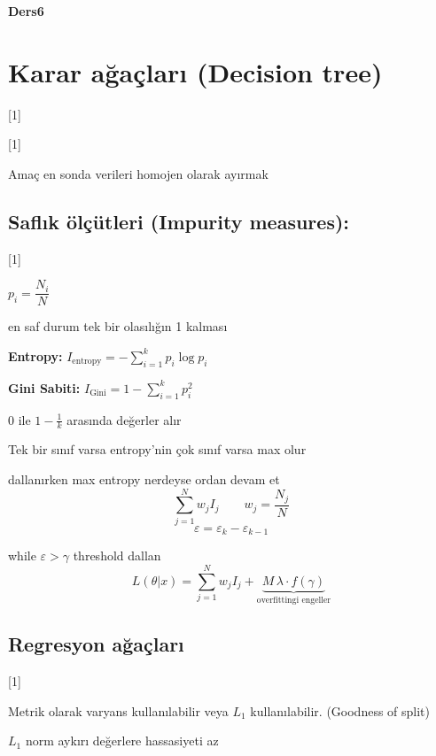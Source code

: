 \documentclass[11pt,a4paper]{article}
\begin{document}

\textbf{Ders6}

\section{Karar ağaçları (Decision tree)}

[1]

[1]

Amaç en sonda verileri homojen olarak ayırmak

\subsection{Saflık ölçütleri (Impurity measures):}

[1]

$p_i=\dfrac{N_i}{N}$

en saf durum tek bir olasılığın 1 kalması

\textbf{Entropy:} \quad $I_{\mathrm{entropy}} = -\sum_{i=1}^{k} p_i \log p_i$

\textbf{Gini Sabiti:} \quad $I_{\mathrm{Gini}} = 1-\sum_{i=1}^{k} p_i^{2}$

0 ile $1-\frac{1}{k}$ arasında değerler alır

Tek bir sınıf varsa entropy'nin çok sınıf varsa max olur

dallanırken max entropy nerdeyse ordan devam et
\[ \sum_{j=1}^{N} w_j I_j \qquad w_j=\frac{N_j}{N} \]
\[ \varepsilon = \varepsilon_k - \varepsilon_{k-1} \]

while $\varepsilon > \gamma$ threshold dallan
\[ L(\theta|x)=\sum_{j=1}^{N} w_j I_j + \underbrace{M\,\lambda\cdot f(\gamma)}_{\text{overfittingi engeller}} \]

\subsection{Regresyon ağaçları}

[1]

Metrik olarak varyans kullanılabilir veya $L_1$ kullanılabilir. (Goodness of split)

$L_1$ norm aykırı değerlere hassasiyeti az
\end{document}
